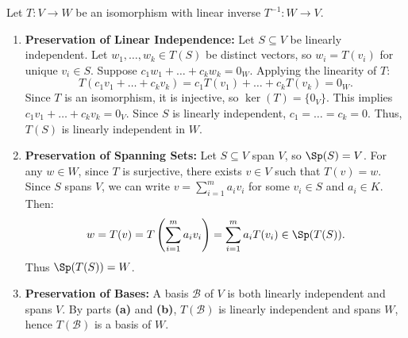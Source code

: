 \begin{exercisesolution}
\label{sol:isomorphisms_preserve_structures}
Let $T \colon V \to W$ be an isomorphism with linear inverse $T^{-1} \colon W \to V$.

\begin{enumerate}[label=\textbf{(\alph*)}]
    \item \textbf{Preservation of Linear Independence:}
    Let $S \subseteq V$ be linearly independent. Let $w_1, \dots, w_k \in T(S)$ be distinct vectors, so $w_i = T(v_i)$ for unique $v_i \in S$.
    Suppose $c_1 w_1 + \dots + c_k w_k = 0_W$.
    Applying the linearity of $T$:
    \[
    T(c_1 v_1 + \dots + c_k v_k) = c_1 T(v_1) + \dots + c_k T(v_k) = 0_W.
    \]
    Since $T$ is an isomorphism, it is injective, so $\ker(T) = \{0_V\}$. This implies $c_1 v_1 + \dots + c_k v_k = 0_V$.
    Since $S$ is linearly independent, $c_1 = \dots = c_k = 0$. Thus, $T(S)$ is linearly independent in $W$.

    \item \textbf{Preservation of Spanning Sets:}
    Let $S \subseteq V$ span $V$, so $\Sp(S) = V$.
    For any $w \in W$, since $T$ is surjective, there exists $v \in V$ such that $T(v) = w$.
    Since $S$ spans $V$, we can write $v = \sum_{i=1}^m a_i v_i$ for some $v_i \in S$ and $a_i \in K$.
    Then:
    \[
    w = T(v) = T\left(\sum_{i=1}^m a_i v_i\right) = \sum_{i=1}^m a_i T(v_i) \in \Sp(T(S)).
    \]
    Thus $\Sp(T(S)) = W$.

    \item \textbf{Preservation of Bases:}
    A basis $\mathcal{B}$ of $V$ is both linearly independent and spans $V$.
    By parts \textbf{(a)} and \textbf{(b)}, $T(\mathcal{B})$ is linearly independent and spans $W$, hence $T(\mathcal{B})$ is a basis of $W$.
\end{enumerate}
\end{exercisesolution}

